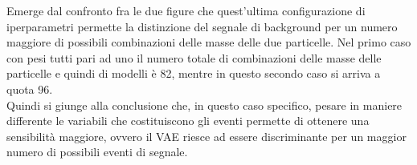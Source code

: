 Emerge dal confronto fra le due figure che quest'ultima configurazione di iperparametri permette la distinzione del segnale di background per un numero maggiore di possibili combinazioni delle masse delle due particelle. Nel primo caso con pesi tutti pari ad uno il numero totale di combinazioni delle masse delle particelle e quindi di modelli è 82, mentre in questo secondo caso si arriva a quota 96. \\
Quindi si giunge alla conclusione che, in questo caso specifico, pesare in maniere differente le variabili che costituiscono gli eventi permette di ottenere una sensibilità maggiore, ovvero il VAE riesce ad essere discriminante per un maggior numero di possibili eventi di segnale.

